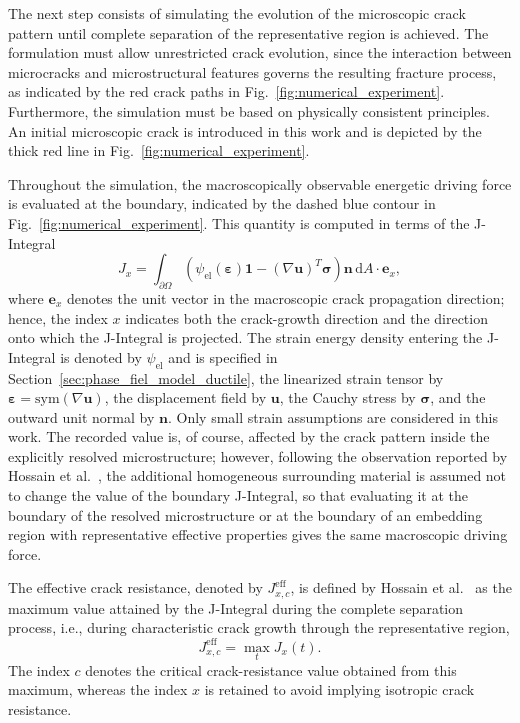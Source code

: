 \documentclass[pdflatex,sn-mathphys-num]{sn-jnl}%
\theoremstyle{thmstyleone}%
\theoremstyle{thmstyletwo}%
\theoremstyle{thmstylethree}%
\begin{document}
The next step consists of simulating the evolution of the microscopic crack pattern until complete separation of the representative region is achieved.
The formulation must allow unrestricted crack evolution, since the interaction between microcracks and microstructural features governs the resulting fracture process, as indicated by the red crack paths in Fig.~\ref{fig:numerical_experiment}.
Furthermore, the simulation must be based on physically consistent principles.
An initial microscopic crack is introduced in this work and is depicted by the thick red line in Fig.~\ref{fig:numerical_experiment}.

Throughout the simulation, the macroscopically observable energetic driving force is evaluated at the boundary, indicated by the dashed blue contour in Fig.~\ref{fig:numerical_experiment}.
This quantity is computed in terms of the J-Integral
\begin{equation}
    J_x = \int_{\partial\Omega}\left(\psi_{\text{el}}(\boldsymbol{\varepsilon})\boldsymbol{1} - \left(\nabla\boldsymbol{u}\right)^T\boldsymbol{\sigma}\right)\boldsymbol{n} \, \mathrm{d}A \cdot \boldsymbol{e}_x,
    \label{eq:J-integral}
\end{equation}
where $\boldsymbol{e}_x$ denotes the unit vector in the macroscopic crack propagation direction; hence, the index $x$ indicates both the crack-growth direction and the direction onto which the J-Integral is projected.
The strain energy density entering the J-Integral is denoted by $\psi_{\text{el}}$ and is specified in Section~\ref{sec:phase_fiel_model_ductile}, the linearized strain tensor by $\boldsymbol{\varepsilon} = \text{sym}(\nabla{\boldsymbol{u}})$, the displacement field by $\boldsymbol{u}$, the Cauchy stress by $\boldsymbol{\sigma}$, and the outward unit normal by $\boldsymbol{n}$.
Only small strain assumptions are considered in this work.
The recorded value is, of course, affected by the crack pattern inside the explicitly resolved microstructure; however, following the observation reported by Hossain et al.~\cite{hossain_effective_2014}, the additional homogeneous surrounding material is assumed not to change the value of the boundary J-Integral, so that evaluating it at the boundary of the resolved microstructure or at the boundary of an embedding region with representative effective properties gives the same macroscopic driving force.

The effective crack resistance, denoted by $J_{x,c}^{\text{eff}}$, is defined by Hossain et al.~\cite{hossain_effective_2014} as the maximum value attained by the J-Integral during the complete separation process, i.e., during characteristic crack growth through the representative region,
\begin{equation}
    J_{x,c}^{\text{eff}} = \max_t J_x(t).
\end{equation}
The index $c$ denotes the critical crack-resistance value obtained from this maximum, whereas the index $x$ is retained to avoid implying isotropic crack resistance.
\end{document}
